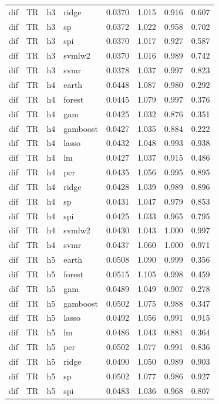 \begin{ThreePartTable}
\begin{longtable}[t]{llclcccc}
dif & TR & h3 & ridge & 0.0370 & 1.015 & 0.916 & 0.607\\
dif & TR & h3 & sp & 0.0372 & 1.022 & 0.958 & 0.702\\
dif & TR & h3 & spi & 0.0370 & 1.017 & 0.927 & 0.587\\
dif & TR & h3 & svmlw2 & 0.0370 & 1.016 & 0.989 & 0.742\\
dif & TR & h3 & svmr & 0.0378 & 1.037 & 0.997 & 0.823\\
\addlinespace
dif & TR & h4 & earth & 0.0448 & 1.087 & 0.980 & 0.292\\
dif & TR & h4 & forest & 0.0445 & 1.079 & 0.997 & 0.376\\
dif & TR & h4 & gam & 0.0425 & 1.032 & 0.876 & 0.351\\
dif & TR & h4 & gamboost & 0.0427 & 1.035 & 0.884 & 0.222\\
dif & TR & h4 & lasso & 0.0432 & 1.048 & 0.993 & 0.938\\
dif & TR & h4 & lm & 0.0427 & 1.037 & 0.915 & 0.486\\
dif & TR & h4 & pcr & 0.0435 & 1.056 & 0.995 & 0.895\\
dif & TR & h4 & ridge & 0.0428 & 1.039 & 0.989 & 0.896\\
dif & TR & h4 & sp & 0.0431 & 1.047 & 0.979 & 0.853\\
dif & TR & h4 & spi & 0.0425 & 1.033 & 0.965 & 0.795\\
dif & TR & h4 & svmlw2 & 0.0430 & 1.043 & 1.000 & 0.997\\
dif & TR & h4 & svmr & 0.0437 & 1.060 & 1.000 & 0.971\\
\addlinespace
dif & TR & h5 & earth & 0.0508 & 1.090 & 0.999 & 0.356\\
dif & TR & h5 & forest & 0.0515 & 1.105 & 0.998 & 0.459\\
dif & TR & h5 & gam & 0.0489 & 1.049 & 0.907 & 0.278\\
dif & TR & h5 & gamboost & 0.0502 & 1.075 & 0.988 & 0.347\\
dif & TR & h5 & lasso & 0.0492 & 1.056 & 0.991 & 0.915\\
dif & TR & h5 & lm & 0.0486 & 1.043 & 0.881 & 0.364\\
dif & TR & h5 & pcr & 0.0502 & 1.077 & 0.991 & 0.836\\
dif & TR & h5 & ridge & 0.0490 & 1.050 & 0.989 & 0.903\\
dif & TR & h5 & sp & 0.0502 & 1.077 & 0.986 & 0.927\\
dif & TR & h5 & spi & 0.0483 & 1.036 & 0.968 & 0.807\\

\end{longtable}
\end{ThreePartTable}
